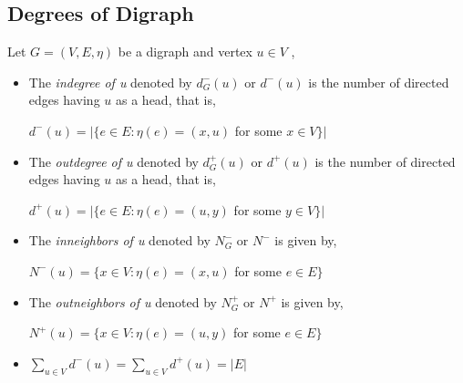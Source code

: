 \subsection{Degrees of Digraph}
Let $G=(V,E,\eta)$ be a digraph and vertex $u \in V$ ,
\begin{itemize}
	\item The \textit{indegree of u} denoted by $d_G^-(u)$ or $d^-(u)$ is the number of directed edges having $u$ as a head, that is,\\
	\begin{center}
	$d^-(u)=|\{e \in E: \eta(e)=(x,u)$ for some $ x \in V\}|$
	\end{center}
	
	\item The \textit{outdegree of u} denoted by $d_G^+(u)$ or $d^+(u)$ is the number of directed edges having $u$ as a head, that is,\\
	\begin{center}
	$d^+(u)=|\{e \in E: \eta(e)=(u,y)$ for some $ y \in V\}|$
	\end{center}
	
	\item The \textit{inneighbors of u} denoted by $N_G^-$ or $N^-$ is given by,
	\begin{center}
	$N^-(u)=\{x \in V: \eta(e)=(x,u)$ for some $ e \in E\}$
	\end{center}
	
	\item The \textit{outneighbors of u} denoted by $N_G^+$ or $N^+$ is given by,
	\begin{center}
	$N^+(u)=\{x \in V: \eta(e)=(u,y)$ for some $ e \in E\}$
	\end{center}
	
	\item 
	\begin{center}
		$\sum\limits_{u\in V} d^-(u) = \sum\limits_{u\in V} d^+(u)=|E|$
	\end{center}
\end{itemize}

